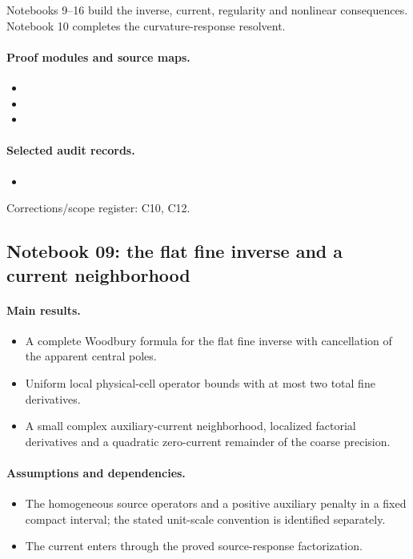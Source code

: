 Notebooks 9--16 build the inverse, current, regularity and nonlinear consequences. Notebook 10 completes the curvature-response resolvent.

\paragraph{Proof modules and source maps.}
\begingroup\small
\begin{itemize}
\item {}
\item {}
\item {}
\end{itemize}
\endgroup

\paragraph{Selected audit records.}
\begingroup\small
\begin{itemize}
\item {}
\end{itemize}
\endgroup
Corrections/scope register: C10, C12.\par

\subsection{Notebook 09: the flat fine inverse and a current neighborhood}
\label{hnc-09}
\noindent{}\par

\paragraph{Main results.}
\begin{itemize}
\item A complete Woodbury formula for the flat fine inverse with cancellation of the apparent central poles.
\item Uniform local physical-cell operator bounds with at most two total fine derivatives.
\item A small complex auxiliary-current neighborhood, localized factorial derivatives and a quadratic zero-current remainder of the coarse precision.
\end{itemize}

\paragraph{Assumptions and dependencies.}
\begin{itemize}
\item The homogeneous source operators and a positive auxiliary penalty in a fixed compact interval; the stated unit-scale convention is identified separately.
\item The current enters through the proved source-response factorization.
\end{itemize}

